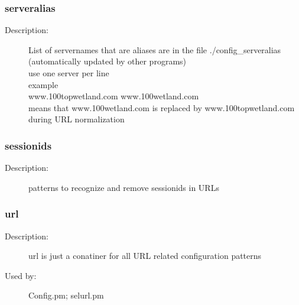 \subsubsection{serveralias}
\label{serveralias}
\begin{description}
\item[Description:] List of servernames that are aliases are in the file ./config\_serveralias \\     (automatically updated by other programs) \\ use one server per line \\ example \\ www.100topwetland.com  www.100wetland.com \\   means that www.100wetland.com is replaced by www.100topwetland.com during URL normalization
\end{description}
\subsubsection{sessionids}
\label{sessionids}
\begin{description}
\item[Description:] patterns to recognize and remove sessionids in URLs
\end{description}
\subsubsection{url}
\label{url}
\begin{description}
\item[Description:] url is just a conatiner for all URL related configuration patterns
\item[Used by:] Config.pm; selurl.pm
\end{description}
